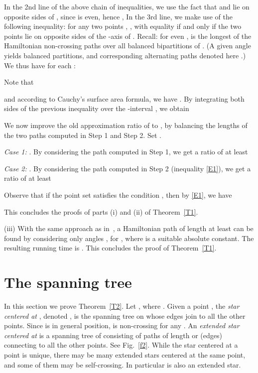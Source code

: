 \documentclass[proceedings]{stacs}
\begin{document}
In the 2nd line of the above chain of inequalities, we use the fact
that  and   lie on opposite sides of ,
since  is even, hence ,
In the 3rd line, we make use of the following inequality:
for any two points ,
,
with equality if and only if the two points lie on opposite sides of
the -axis of .
Recall: for even ,  is the longest of the  Hamiltonian
non-crossing paths  over all  balanced
bipartitions of . (A given angle  yields 
balanced partitions, and corresponding alternating paths denoted here
.) We thus have for each :

Note that

and according to Cauchy's surface area formula,
we have .
By integrating both sides of the previous inequality over the
-interval , we obtain


We now improve the old approximation ratio of  to , by
balancing the lengths of the two paths computed in {\sc Step 1} and
{\sc Step 2}. Set .


\smallskip
{\em Case 1:} . By
considering the path computed in {\sc Step 1}, we get a ratio of
at least


\smallskip
{\em Case 2:} . By considering the path
computed in {\sc Step 2} (inequality \eqref{E1}), we get a ratio of at least


\smallskip
Observe that if the point set satisfies the condition
, then by \eqref{E1},
we have

This concludes the proofs of parts (i) and (ii) of Theorem~\ref{T1}.

\smallskip
(iii) With the same approach as in~\cite{ARS95}, a Hamiltonian path of
length at least 
can be found by considering only  angles
, for
, where  is a suitable
absolute constant. The resulting running time is .
This concludes the proof of Theorem~\ref{T1}.




\section{The spanning tree} \label{sec:tree}

In this section we prove Theorem~\ref{T2}.
Let , where .
Given a point , the {\em star centered at} ,
denoted , is the spanning tree on  whose edges join  to all
the other points. Since  is in general position,  is
non-crossing for any .
An {\em extended star centered at}  is a spanning tree of 
consisting of paths of length  or  (edges) connecting  to all
the other points.
See Fig.~\ref{f2}. While the star centered at a point is unique, there
may be many extended stars centered at the same point, and some of
them may be self-crossing. In particular  is also an extended
star.
\end{document}
